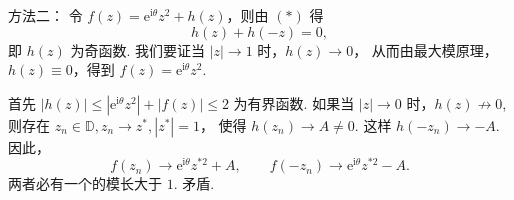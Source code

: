 \begin{enumerate}
方法二：
令 $f(z)=\mathrm{e}^{\mathrm{i} \theta} z^{2}+h(z)$，则由 $(*)$ 得
$$h(z)+h(-z)=0,$$
即 $h(z)$ 为奇函数. 我们要证当 $|z| \rightarrow 1$ 时，$h(z) \rightarrow 0$，
从而由最大模原理，$h(z) \equiv 0$，得到 $f(z)=\mathrm{e}^{\mathrm{i} \theta} z^{2}$.

首先 $|h(z)| \leq\left|\mathrm{e}^{\mathrm{i} \theta} z^{2}\right|+|f(z)| \leq 2$ 为有界函数.
如果当 $|z| \rightarrow 0$ 时，$h(z) \nrightarrow 0$, 
则存在 $z_{n} \in \mathbb{D}, z_{n} \rightarrow z^{*},|z^{*}|=1$，
使得 $h(z_{n}) \rightarrow A \neq 0$. 
这样 $h(-z_{n}) \rightarrow-A$. 因此，
$$f(z_{n}) \rightarrow \mathrm{e}^{\mathrm{i} \theta} z^{* 2}+A, \qquad 
f(-z_{n}) \rightarrow \mathrm{e}^{\mathrm{i} \theta} z^{* 2}-A.$$
两者必有一个的模长大于 $1$. 矛盾.
\end{enumerate}